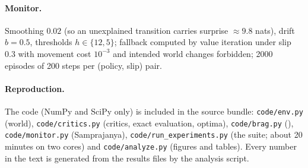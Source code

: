 \paragraph{Monitor.}
Smoothing $0.02$ (so an unexplained transition carries surprise $\approx9.8$ nats), drift $b=0.5$, thresholds $h\in\{12,5\}$; fallback computed by value iteration under slip $0.3$ with movement cost $10^{-3}$ and intended world changes forbidden; 2000 episodes of 200 steps per (policy, slip) pair.

\paragraph{Reproduction.}
The code (NumPy and SciPy only) is included in the source bundle: \texttt{code/env.py} (world), \texttt{code/critics.py} (critics, exact evaluation, optima), \texttt{code/brag.py} (\BRAG), \texttt{code/monitor.py} (Samprajanya), \texttt{code/run\_experiments.py} (the suite; about 20 minutes on two cores) and \texttt{code/analyze.py} (figures and tables).
Every number in the text is generated from the results files by the analysis script.
